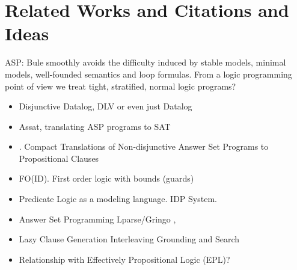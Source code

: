 \documentclass[conference]{IEEEtran}
\begin{document}
\section{Related Works and Citations and Ideas}

ASP: Bule smoothly avoids the difficulty induced by stable models, minimal models, well-founded 
semantics and loop formulas. From a logic programming point of view we treat tight, stratified, normal logic programs?

\begin{itemize}
    \item Disjunctive Datalog, DLV \cite{Eiter97} or even just Datalog \cite{Gottlob89}
    \item Assat, translating ASP programs to SAT \cite{Lin04}
    \item \cite{Janhunen11}. Compact Translations of Non-disjunctive Answer Set
        Programs to Propositional Clauses
    \item FO(ID). First order logic with bounds (guards) \cite{Wittocx10}
    \item Predicate Logic as a modeling language. IDP System. \cite{Cat18}
    \item Answer Set Programming Lparse/Gringo \cite{Gebser15}, \cite{Ferraris05}
    \item Lazy Clause Generation Interleaving Grounding and Search \cite{Cat15}
    \item Relationship with Effectively Propositional Logic (EPL)? 
\end{itemize}



\end{document}
